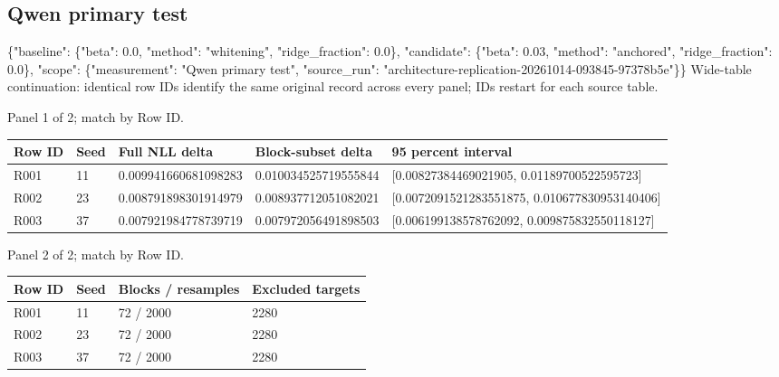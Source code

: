 \documentclass[10pt]{article}
\begin{document}
\subsection{Qwen primary test}
\{"baseline": \{"beta": 0.0, "method": "whitening", "ridge\_fraction": 0.0\}, "candidate": \{"beta": 0.03, "method": "anchored", "ridge\_fraction": 0.0\}, "scope": \{"measurement": "Qwen primary test", "source\_run": "architecture-replication-20261014-093845-97378b5e"\}\}
Wide-table continuation: identical row IDs identify the same original record across every panel; IDs restart for each source table.
\par\noindent Panel 1 of 2; match by Row ID.
{\scriptsize\setlength{\tabcolsep}{2pt}
\begin{longtable}{p{}p{}p{}p{}p{}}
Row ID & Seed & Full NLL delta & Block-subset delta & 95 percent interval \\
\hline\endhead
R001 & 11 & 0.009941660681098283 & 0.010034525719555844 & [0.00827384469021905, 0.01189700522595723] \\
R002 & 23 & 0.008791898301914979 & 0.008937712051082021 & [0.0072091521283551875, 0.010677830953140406] \\
R003 & 37 & 0.007921984778739719 & 0.007972056491898503 & [0.006199138578762092, 0.009875832550118127] \\
\end{longtable}}
\par\noindent Panel 2 of 2; match by Row ID.
{\scriptsize\setlength{\tabcolsep}{2pt}
\begin{longtable}{p{}p{}p{}p{}}
Row ID & Seed & Blocks / resamples & Excluded targets \\
\hline\endhead
R001 & 11 & 72 / 2000 & 2280 \\
R002 & 23 & 72 / 2000 & 2280 \\
R003 & 37 & 72 / 2000 & 2280 \\
\end{longtable}}
\end{document}
